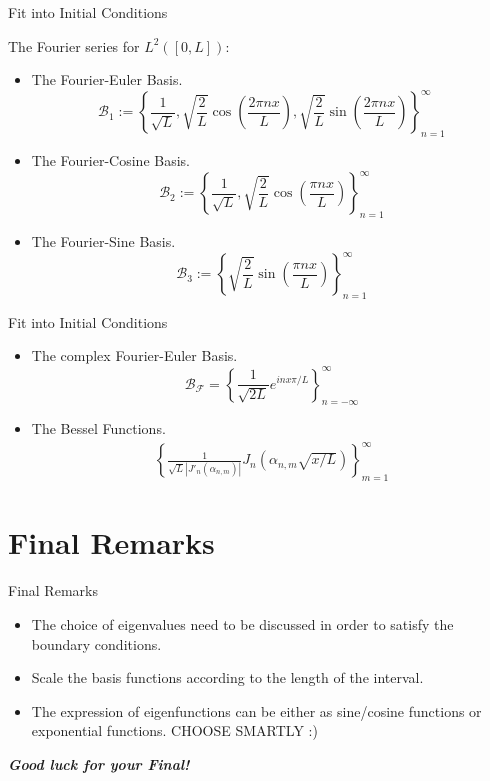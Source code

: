 \documentclass[hyperref={pdfpagelabels=true}]{beamer}
\newcommand{\highlightr}[1]{\textcolor[rgb]{1,0.3,0.2}{\emph{\textbf{#1}}}}
\newcommand{\structb}[1]{\textcolor[rgb]{0.2,0.2,0.7}{#1}}
\begin{document}
\begin{frame}{Fit into Initial Conditions}

The Fourier series for $L^2([0, L])$:
\begin{itemize}
	\item \structb{The Fourier-Euler Basis.}
	$$
	\mathcal{B}_1 := \left\{\frac{1}{\sqrt{L}}, \sqrt{\frac{2}{L}}\cos\left(\frac{2\pi nx}{L} \right), \sqrt{\frac{2}{L}}\sin\left(\frac{2\pi nx}{L} \right) \right\}^{\infty}_{n=1}
	$$
	\item \structb{The Fourier-Cosine Basis.}
	$$
	\mathcal{B}_2 := \left\{\frac{1}{\sqrt{L}}, \sqrt{\frac{2}{L}}\cos\left(\frac{\pi nx}{L} \right) \right\}^{\infty}_{n=1}
	$$
	\item \structb{The Fourier-Sine Basis.}
	$$
	\mathcal{B}_3 := \left\{\sqrt{\frac{2}{L}}\sin\left(\frac{\pi nx}{L} \right) \right\}^{\infty}_{n=1}
	$$
\end{itemize}


\end{frame}



\begin{frame}{Fit into Initial Conditions}

\begin{block}{}
	\begin{itemize}
		\item \structb{The complex Fourier-Euler Basis.}
		$$
		\mathcal{B}_{\mathcal{F}} = \left\{\frac{1}{\sqrt{2L}} e^{inx\pi/L} \right\}_{n=-\infty}^{\infty}
		$$
		\item\structb{The Bessel Functions.}
		\begin{align*}
		\left\{\frac{1}{\sqrt{L}|J'_n(\alpha_{n, m})|} J_n(\alpha_{n, m}\sqrt{x/L}) \right\}_{m=1}^{\infty}
		\end{align*}
	\end{itemize}
\end{block}


\end{frame}





\section{Final Remarks}


\begin{frame}{Final Remarks}


\begin{itemize}
	\justifying
	\item The choice of eigenvalues need to be discussed in order to satisfy the boundary conditions.
	\item Scale the basis functions according to the length of the interval.
	\item The expression of eigenfunctions can be either as sine/cosine functions or exponential functions. CHOOSE SMARTLY :)
\end{itemize}


\end{frame}




\begin{frame}{}
  
  \centering
  \highlightr{Good luck for your Final!}
  
  
\end{frame}
\end{document}
